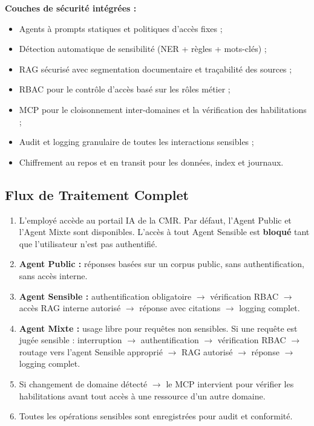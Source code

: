 \documentclass[12pt, a4paper]{report}
\begin{document}
\textbf{Couches de sécurité intégrées :}
\begin{itemize}
  \item Agents à prompts statiques et politiques d'accès fixes ;
  \item Détection automatique de sensibilité (NER + règles + mots-clés) ;
  \item RAG sécurisé avec segmentation documentaire et traçabilité des
        sources ;
  \item RBAC pour le contrôle d'accès basé sur les rôles métier ;
  \item MCP pour le cloisonnement inter-domaines et la vérification des
        habilitations ;
  \item Audit et logging granulaire de toutes les interactions sensibles ;
  \item Chiffrement au repos et en transit pour les données, index et
        journaux.
\end{itemize}

\subsection{Flux de Traitement Complet}

\begin{enumerate}
  \item L'employé accède au portail IA de la CMR. Par défaut, l'Agent
        Public et l'Agent Mixte sont disponibles. L'accès à tout Agent
        Sensible est \textbf{bloqué} tant que l'utilisateur n'est pas
        authentifié.
  \item \textbf{Agent Public :} réponses basées sur un corpus public,
        sans authentification, sans accès interne.
  \item \textbf{Agent Sensible :} authentification obligatoire
        $\rightarrow$ vérification RBAC $\rightarrow$ accès RAG interne
        autorisé $\rightarrow$ réponse avec citations $\rightarrow$
        logging complet.
  \item \textbf{Agent Mixte :} usage libre pour requêtes non sensibles.
        Si une requête est jugée sensible : interruption $\rightarrow$
        authentification $\rightarrow$ vérification RBAC $\rightarrow$
        routage vers l'agent Sensible approprié $\rightarrow$ RAG
        autorisé $\rightarrow$ réponse $\rightarrow$ logging complet.
  \item Si changement de domaine détecté $\rightarrow$ le MCP intervient
        pour vérifier les habilitations avant tout accès à une ressource
        d'un autre domaine.
  \item Toutes les opérations sensibles sont enregistrées pour audit et
        conformité.
\end{enumerate}
\end{document}
